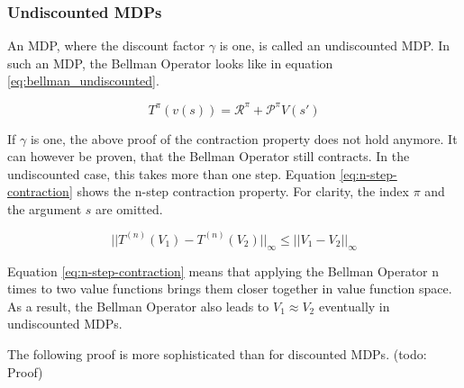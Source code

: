 \subsubsection{Undiscounted MDPs}

An MDP, where the discount factor $\gamma$ is one, is called an undiscounted MDP. In such an MDP, the Bellman Operator looks like in equation \ref{eq:bellman_undiscounted}.

\begin{equation}
T^\pi(v(s))=\mathcal{R}^\pi + \mathcal{P}^\pi V(s')
\label{eq:bellman_undiscounted}
\end{equation}

If $\gamma$ is one, the above proof of the contraction property does not hold anymore. It can however be proven, that the Bellman Operator still contracts. In the undiscounted case, this takes more than one step. Equation \ref{eq:n-step-contraction} shows the n-step contraction property. For clarity, the index $\pi$ and the argument $s$ are omitted.

\begin{equation}
||T^{(n)}(V_1)-T^{(n)}(V_2)||_\infty \leq ||V_1-V_2||_\infty
\label{eq:n-step-contraction}
\end{equation}

Equation \ref{eq:n-step-contraction} means that applying the Bellman Operator n times to two value functions brings them closer together in value function space. As a result, the Bellman Operator also leads to $V_1 \approx V_2$ eventually in undiscounted MDPs.

The following proof is more sophisticated than for discounted MDPs. 
(todo: Proof)

